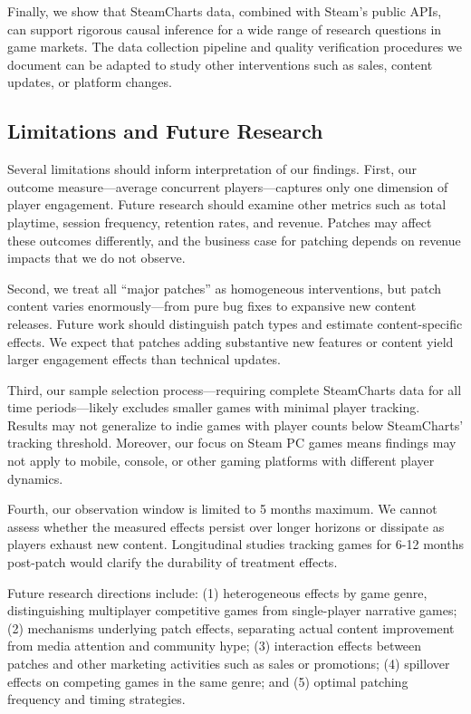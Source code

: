 \documentclass[12pt,a4paper]{article}
\begin{document}
Finally, we show that SteamCharts data, combined with Steam's public APIs, can support rigorous causal inference for a wide range of research questions in game markets. The data collection pipeline and quality verification procedures we document can be adapted to study other interventions such as sales, content updates, or platform changes.

\subsection{Limitations and Future Research}

Several limitations should inform interpretation of our findings. First, our outcome measure---average concurrent players---captures only one dimension of player engagement. Future research should examine other metrics such as total playtime, session frequency, retention rates, and revenue. Patches may affect these outcomes differently, and the business case for patching depends on revenue impacts that we do not observe.

Second, we treat all ``major patches'' as homogeneous interventions, but patch content varies enormously---from pure bug fixes to expansive new content releases. Future work should distinguish patch types and estimate content-specific effects. We expect that patches adding substantive new features or content yield larger engagement effects than technical updates.

Third, our sample selection process---requiring complete SteamCharts data for all time periods---likely excludes smaller games with minimal player tracking. Results may not generalize to indie games with player counts below SteamCharts' tracking threshold. Moreover, our focus on Steam PC games means findings may not apply to mobile, console, or other gaming platforms with different player dynamics.

Fourth, our observation window is limited to 5 months maximum. We cannot assess whether the measured effects persist over longer horizons or dissipate as players exhaust new content. Longitudinal studies tracking games for 6-12 months post-patch would clarify the durability of treatment effects.

Future research directions include: (1) heterogeneous effects by game genre, distinguishing multiplayer competitive games from single-player narrative games; (2) mechanisms underlying patch effects, separating actual content improvement from media attention and community hype; (3) interaction effects between patches and other marketing activities such as sales or promotions; (4) spillover effects on competing games in the same genre; and (5) optimal patching frequency and timing strategies.
\end{document}
